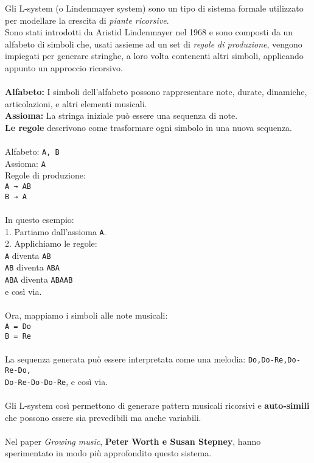 \documentclass[a4paper,12pt]{report}
\begin{document}
Gli L-system (o Lindenmayer system) sono un tipo di sistema formale utilizzato per modellare la crescita di \textit{piante ricorsive}. \\
Sono stati introdotti da Aristid Lindenmayer nel 1968 e sono composti da un alfabeto di simboli che, usati assieme ad un set di \textit{regole di produzione}, vengono impiegati per generare stringhe, a loro volta contenenti altri simboli, applicando appunto un approccio ricorsivo. \\
\\
\textbf{Alfabeto:} I simboli dell'alfabeto possono rappresentare note, durate, dinamiche, articolazioni, e altri elementi musicali. \\
\textbf{Assioma:} La stringa iniziale può essere una sequenza di note. \\
\textbf{Le regole} descrivono come trasformare ogni simbolo in una nuova sequenza. \\
\\
Alfabeto: \texttt{A, B} \\
Assioma: \texttt{A} \\
Regole di produzione: \\
  \texttt{A → AB} \\
  \texttt{B → A} \\
\\
In questo esempio: \\
1. Partiamo dall'assioma \texttt{A}. \\
2. Applichiamo le regole: \\
    \texttt{A} diventa \texttt{AB} \\
   \texttt{AB} diventa \texttt{ABA} \\
   \texttt{ABA} diventa \texttt{ABAAB} \\
   e così via. \\
\\
Ora, mappiamo i simboli alle note musicali: \\
\texttt{A = Do} \\
\texttt{B = Re} \\
\\
La sequenza generata può essere interpretata come una melodia: \texttt{Do,Do-Re,Do-Re-Do, \\ Do-Re-Do-Do-Re}, e così via. \\
\\
Gli L-system così permettono di generare pattern musicali ricorsivi e \textbf{auto-simili} che possono essere sia prevedibili ma anche variabili. \\
\\
Nel paper \textit{Growing music}, \textbf{Peter Worth e Susan Stepney}, hanno sperimentato in modo più approfondito questo sistema. \\
\end{document}
